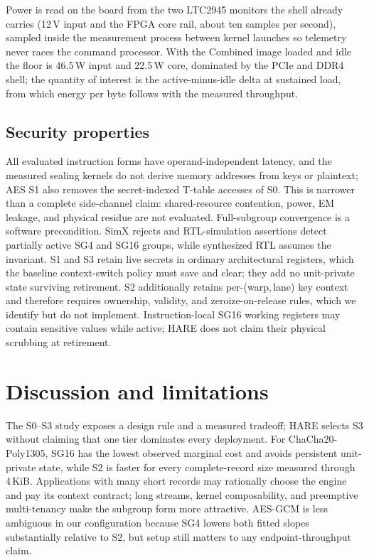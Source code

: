 \documentclass[conference]{IEEEtran}
\begin{document}
Power is read on the board from the two LTC2945 monitors the shell already
carries (12\,V input and the FPGA core rail, about ten samples per second),
sampled inside the measurement process between kernel launches so
telemetry never races the command processor. With the Combined image loaded
and idle the floor is 46.5\,W input and 22.5\,W core, dominated by the PCIe
and DDR4 shell; the quantity of interest is the active-minus-idle delta at
sustained load, from which energy per byte follows with the measured
throughput.

\subsection{Security properties}
All evaluated instruction forms have operand-independent latency, and the
measured sealing
kernels do not derive memory addresses from keys or plaintext; AES S1 also
removes the secret-indexed T-table accesses of S0. This is narrower than a
complete side-channel claim: shared-resource contention, power, EM leakage,
and physical residue are not evaluated. Full-subgroup convergence is a
software precondition. SimX rejects and RTL-simulation assertions detect
partially active SG4 and SG16 groups, while synthesized RTL assumes the
invariant. S1 and S3 retain live secrets in ordinary architectural registers,
which the baseline context-switch policy must save and clear; they add no
unit-private state surviving retirement. S2 additionally retains
per-(warp,\,lane) key context and therefore requires ownership, validity, and
zeroize-on-release rules, which we identify but do not implement.
Instruction-local SG16 working registers may contain sensitive values while
active; HARE does not claim their physical scrubbing at retirement.

\section{Discussion and limitations}\label{sec:discussion}
The S0--S3 study exposes a design rule and a measured tradeoff; HARE selects
S3 without claiming that one tier dominates every deployment. For
ChaCha20-Poly1305, SG16 has the lowest
observed marginal cost and avoids persistent unit-private state, while S2 is
faster for every complete-record size measured through 4\,KiB. Applications
with many short records may rationally choose the engine and pay its context
contract; long streams, kernel composability, and preemptive multi-tenancy make
the subgroup form more attractive. AES-GCM is less ambiguous in our
configuration because SG4 lowers both fitted slopes substantially relative to
S2, but setup still matters to any endpoint-throughput claim.
\end{document}
